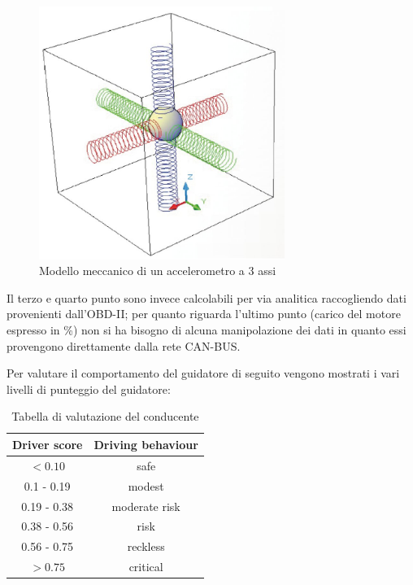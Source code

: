 \documentclass[12pt, a4paper, italian]{report}
\numberwithin{figure}{chapter}
\numberwithin{table}{chapter}
\begin{document}
\begin{figure}[h]
  \centering
  \includegraphics[width=8cm]{Accelerometro.jpg}
  \caption{Modello meccanico di un accelerometro a 3 assi}
  \label{fig:accelerometro}
\end{figure}

Il terzo e quarto punto sono invece calcolabili per via analitica raccogliendo dati provenienti dall'OBD-II; per quanto riguarda l'ultimo punto (carico del motore espresso in \%) non si ha bisogno di alcuna manipolazione dei dati in quanto essi provengono direttamente dalla rete CAN-BUS.

Per valutare il comportamento del guidatore di seguito vengono mostrati i vari livelli di punteggio del guidatore:

\begin{table}[h!]
  \centering
  \begin{tabular}{|c|c|}
    \hline
    \textbf{Driver score} & \textbf{Driving behaviour} \\
    \hline
    \(< 0.10\) & safe \\
    \hline
    0.1 - 0.19 & modest \\
    \hline
    0.19 - 0.38 & moderate risk \\
    \hline
    0.38 - 0.56 & risk \\
    \hline
     0.56 - 0.75 & reckless \\
    \hline
     \(> 0.75\) & critical \\
    \hline
  \end{tabular}
  \caption{Tabella di valutazione del conducente}
  \label{tab:example}
\end{table}
\end{document}
